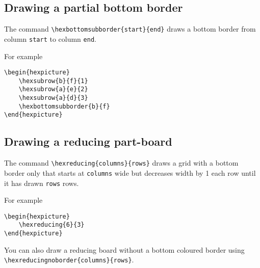 \documentclass[a4paper,12pt]{article}
\begin{document}
    \begin{hexpicture}
    \end{hexpicture}
    
    \subsection{Drawing a partial bottom border}
    
    The command \verb|\hexbottomsubborder{start}{end}| draws a bottom border from column \verb|start| to column \verb|end|.
    
    For example
    
    \begin{verbatim}\begin{hexpicture}
    \hexsubrow{b}{f}{1}
    \hexsubrow{a}{e}{2}
    \hexsubrow{a}{d}{3}
    \hexbottomsubborder{b}{f}
\end{hexpicture}\end{verbatim}
    
    \begin{hexpicture}
    \end{hexpicture}
    
    \subsection{Drawing a reducing part-board}
    
    The command \verb|\hexreducing{columns}{rows}| draws a grid with a bottom border only that starts at \verb|columns| wide but decreases width by 1 each row until it has drawn \verb|rows| rows. 
    
    For example
    
    \begin{verbatim}\begin{hexpicture}
    \hexreducing{6}{3}
\end{hexpicture}\end{verbatim}
    
    \begin{hexpicture}
    \end{hexpicture}

    You can also draw a reducing board without a bottom coloured border using\\
    \verb|\hexreducingnoborder{columns}{rows}|.
\end{document}
